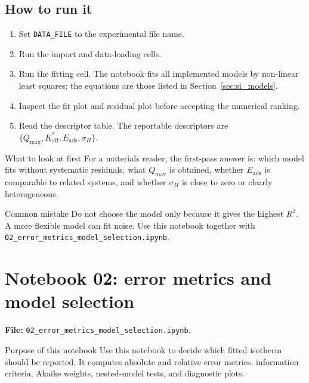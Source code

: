 \documentclass[journal=jacsat,manuscript=article]{achemso}
\begin{document}
\subsection*{How to run it}

\begin{enumerate}
	\item Set \texttt{DATA\_FILE} to the experimental file name.
	\item Run the import and data-loading cells.
	\item Run the fitting cell. The notebook fits all implemented models by
	non-linear least squares; the equations are those listed in
	Section~\ref{sec:si_models}.
	\item Inspect the fit plot and residual plot before accepting the numerical
	ranking.
	\item Read the descriptor table. The reportable descriptors are
	\(\{Q_{\max},K_{\mathrm{aff}}^{\ast},E_{\mathrm{ads}},\sigma_H\}\).
\end{enumerate}

\begin{greenbox}{What to look at first}
	For a materials reader, the first-pass answer is: which model fits
	without systematic residuals, what \(Q_{\max}\) is obtained, whether
	\(E_{\mathrm{ads}}\) is comparable to related systems, and whether
	\(\sigma_H\) is close to zero or clearly heterogeneous.
\end{greenbox}

\begin{redbox}{Common mistake}
	Do not choose the model only because it gives the highest \(R^2\). A
	more flexible model can fit noise. Use this notebook together with
	\texttt{02\_error\_metrics\_model\_selection.ipynb}.
\end{redbox}

\section{Notebook 02: error metrics and model selection}
\label{app:si_notebook_02}

\noindent\textbf{File:} \texttt{02\_error\_metrics\_model\_selection.ipynb}.

\begin{bluebox}{Purpose of this notebook}
	Use this notebook to decide which fitted isotherm should be reported.
	It computes absolute and relative error metrics, information criteria,
	Akaike weights, nested-model tests, and diagnostic plots.
\end{bluebox}
\end{document}
